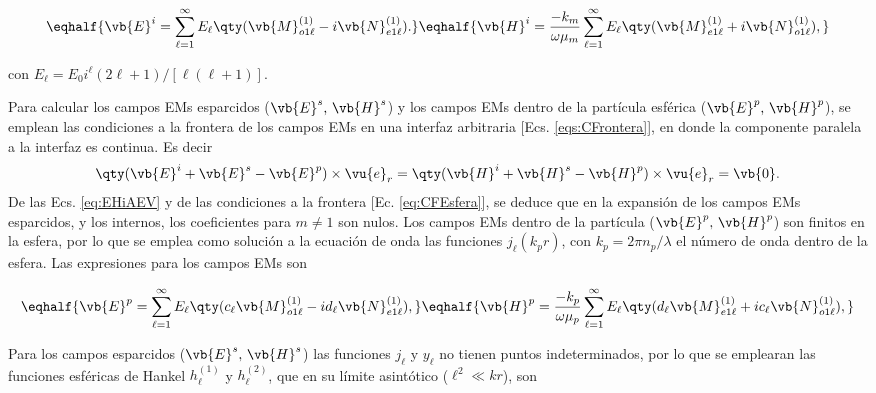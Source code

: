 	\begin{subequations}
	\eqhalf{	\vb{E}^i = \sum_{\ell =1}^\infty  E_\ell\qty(\vb{M}_{o1\ell}^{(1)}-i\vb{N}_{e1\ell}^{(1)}).\label{eqs:EiAEV}}
	\eqhalf{\vb{H}^i =\frac{-k_m}{\omega\mu_m} \sum_{\ell =1}^\infty  E_\ell\qty(\vb{M}_{e1\ell}^{(1)}+i\vb{N}_{o1\ell}^{(1)}),	\label{eqs:HiAEV}}
	\label{eq:EHiAEV}		
	\end{subequations}\vspace*{-1em}
	
\noindent con $E_\ell = E_0 i^\ell (2\ell+1)/[\ell(\ell+1)]$.

Para calcular los campos EMs esparcidos ($\vb{E}^s,\,\vb{H}^s$) y los campos EMs dentro de la partícula esférica ($\vb{E}^p,\,\vb{H}^p$), se emplean las condiciones a la frontera de los campos EMs en una interfaz arbitraria [Ecs. \eqref{eqs:CFrontera}], en donde la componente paralela a la interfaz es continua. Es decir 
	\begin{align}
	\qty(\vb{E}^i+\vb{E}^s -\vb{E}^p)\times\vu{e}_r =
	\qty(\vb{H}^i+\vb{H}^s -\vb{H}^p)\times\vu{e}_r = \vb{0}.
	\label{eq:CFEsfera}
	\end{align}
De las Ecs. \eqref{eq:EHiAEV} y de las condiciones a la frontera [Ec. \eqref{eq:CFEsfera}], se deduce que en la expansión de los campos EMs esparcidos, y los internos, los coeficientes para $m\neq 1$ son nulos. Los campos EMs dentro de la partícula ($\vb{E}^p,\,\vb{H}^p$) son finitos en la esfera, por lo que se emplea como solución a la ecuación de onda las funciones $j_\ell(k_p r)$, con $k_p = 2\pi n_p /\lambda$ el número de onda dentro de la esfera. Las expresiones para los campos EMs son 
	
	\begin{subequations}
	\eqhalf{\vb{E}^p = \sum_{\ell =1}^\infty E_\ell \qty(c_\ell \vb{M}_{o1\ell}^{(1)}-i d_\ell\vb{N}_{e1\ell}^{(1)}),	\label{eqs:EpAEV}}
	\eqhalf{\vb{H}^p = \frac{-k_p}{\omega\mu_p} \sum_{\ell =1}^\infty E_\ell\qty(d_\ell\vb{M}_{e1\ell}^{(1)}+i c_\ell\vb{N}_{o1\ell}^{(1)}),\label{eqs:HpAEV}}
	\label{eq:EHpAEV}		
	\end{subequations}

Para los campos esparcidos ($\vb{E}^s,\,\vb{H}^s$) las funciones $j_\ell$ y $y_\ell$ no tienen puntos indeterminados, por lo que se emplearan las funciones esféricas de Hankel $h_\ell^{(1)}$ y $h_\ell^{(2)}$, que en su límite asintótico ($\ell^2\ll kr$), son \cite{bohren1998absorption}

